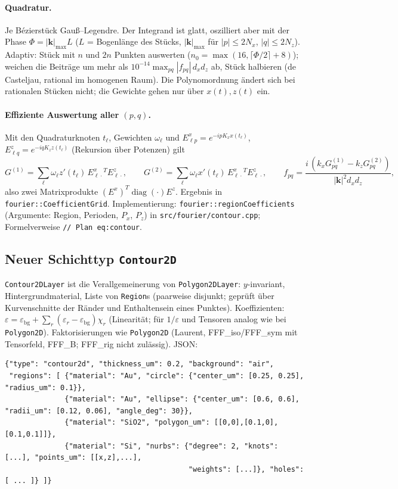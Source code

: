 \paragraph{Quadratur.} Je Bézierstück Gauß--Legendre. Der Integrand ist glatt, oszilliert aber mit der Phase
$\Phi=|\mathbf k|_{\max}L$ ($L$ = Bogenlänge des Stücks, $|\mathbf k|_{\max}$ für $|p|\le2N_x$, $|q|\le2N_z$).
Adaptiv: Stück mit $n$ und $2n$ Punkten auswerten ($n_0=\max(16,\lceil\Phi/2\rceil+8)$); weichen die Beiträge um
mehr als $10^{-14}\max_{pq}|f_{pq}|\,d_xd_z$ ab, Stück halbieren (de Casteljau, rational im homogenen Raum).
Die Polynomordnung ändert sich bei rationalen Stücken nicht; die Gewichte gehen nur über $x(t),z(t)$ ein.

\paragraph{Effiziente Auswertung aller $(p,q)$.} Mit den Quadraturknoten $t_\ell$, Gewichten $\omega_\ell$ und
$E^x_{\ell p}=e^{-ipK_xx(t_\ell)}$, $E^z_{\ell q}=e^{-iqK_zz(t_\ell)}$ (Rekursion über Potenzen) gilt
\[
  G^{(1)}=\sum_\ell\omega_\ell z'(t_\ell)\,E^x_{\ell\cdot}{}^{\!T}E^z_{\ell\cdot},\qquad
  G^{(2)}=\sum_\ell\omega_\ell x'(t_\ell)\,E^x_{\ell\cdot}{}^{\!T}E^z_{\ell\cdot},\qquad
  f_{pq}=\frac{i\,(k_xG^{(1)}_{pq}-k_zG^{(2)}_{pq})}{|\mathbf k|^2d_xd_z},
\]
also zwei Matrixprodukte $(E^x)^T\operatorname{diag}(\cdot)E^z$. Ergebnis in \verb|fourier::CoefficientGrid|.
Implementierung: \verb|fourier::regionCoefficients| (Argumente: Region, Perioden, $P_x$, $P_z$) in
\verb|src/fourier/contour.cpp|; Formelverweise \verb|// Plan eq:contour|.

\subsection{Neuer Schichttyp \texttt{Contour2D}}
\verb|Contour2DLayer| ist die Verallgemeinerung von \verb|Polygon2DLayer|: $y$-invariant, Hintergrundmaterial,
Liste von \verb|Region|s (paarweise disjunkt; geprüft über Kurvenschnitte der Ränder und Enthaltensein eines Punktes).
Koeffizienten: $\varepsilon=\varepsilon_{\text{bg}}+\sum_r(\varepsilon_r-\varepsilon_{\text{bg}})\chi_r$ (Linearität;
für $1/\varepsilon$ und Tensoren analog wie bei \verb|Polygon2D|). Faktorisierungen wie \verb|Polygon2D|
(Laurent, FFF\_iso/FFF\_sym mit Tensorfeld, FFF\_B; FFF\_rig nicht zulässig).
JSON:
{\footnotesize\begin{verbatim}
{"type": "contour2d", "thickness_um": 0.2, "background": "air",
 "regions": [ {"material": "Au", "circle": {"center_um": [0.25, 0.25], "radius_um": 0.1}},
              {"material": "Au", "ellipse": {"center_um": [0.6, 0.6], "radii_um": [0.12, 0.06], "angle_deg": 30}},
              {"material": "SiO2", "polygon_um": [[0,0],[0.1,0],[0.1,0.1]]},
              {"material": "Si", "nurbs": {"degree": 2, "knots": [...], "points_um": [[x,z],...],
                                           "weights": [...]}, "holes": [ ... ]} ]}
\end{verbatim}}

